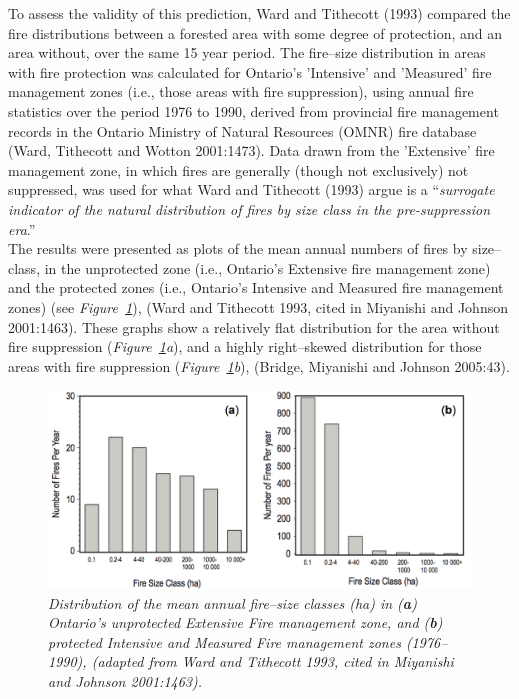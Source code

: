 \begin{spacing}{1.5}
\noindent To assess the validity of this prediction, Ward and Tithecott (1993) compared the fire distributions between a forested area with some degree of protection, and an area without, over the same 15 year period. The fire--size distribution in areas with fire protection was calculated for Ontario's 'Intensive' and 'Measured' fire management zones (i.e., those areas with fire suppression), using annual fire statistics over the period 1976 to 1990, derived from provincial fire management records in the Ontario Ministry of Natural Resources (OMNR) fire database (Ward, Tithecott and Wotton 2001:1473). Data drawn from the 'Extensive' fire management zone, in which fires are generally (though not exclusively) not suppressed, was used for what Ward and Tithecott (1993) argue is a ``\emph{surrogate indicator of the natural distribution of fires by size class in the pre-suppression era}.'' \\

\noindent The results were presented as plots of the mean annual numbers of fires by size--class, in the unprotected zone (i.e., Ontario's Extensive fire management zone) and the protected zones (i.e., Ontario's Intensive and Measured fire management zones) (see \emph{Figure~\ref{fig3}}), (Ward and Tithecott 1993, cited in Miyanishi and Johnson 2001:1463). These graphs show a relatively flat distribution for the area without fire suppression (\emph{Figure~\ref{fig3}a}), and a highly right--skewed distribution for those areas with fire suppression (\emph{Figure~\ref{fig3}b}), (Bridge, Miyanishi and Johnson 2005:43). \\

\begin{figure}[h!]
  \centering
    \includegraphics[width=1\textwidth]{media/fig3}
      \caption[Distribution of mean annual fire--size classes]{\emph{Distribution of the mean annual fire--size classes (\emph{ha}) in (\textbf{a}) Ontario's unprotected Extensive Fire management zone, and (\textbf{b}) protected Intensive and Measured Fire management zones (1976--1990), (adapted from Ward and Tithecott 1993, cited in Miyanishi and Johnson 2001:1463).}}
        \label{fig3}
\end{figure}


\end{spacing}

